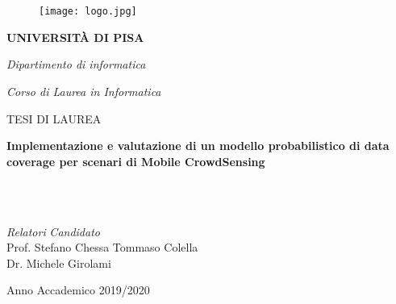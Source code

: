 \begin{titlepage}
\onehalfspacing


 \ \\ \ \\
\begin{figure}[htbp]
\begin{center}
\texttt{[image: logo.jpg]}
\end{center}
\end{figure}


\begin{center}
\begin{large}
\textbf{UNIVERSITÀ DI PISA}
\end{large}

\textsl{Dipartimento di informatica}

\begin{normalsize}
\textsl{Corso di Laurea in Informatica}
\\
\end{normalsize}
\vspace{2cm}
	TESI DI LAUREA \\

\begin{Large}
	\textbf{Implementazione e valutazione di un modello probabilistico di data coverage per scenari di Mobile CrowdSensing} \\
\end{Large}


\ \\ \ \\
\end{center}

\begin{normalsize}
\begin{flushleft}
\textit{Relatori}  \hspace{238pt} \textit{Candidato}
\\ \vspace{5pt} Prof. Stefano Chessa \hspace{6cm} Tommaso Colella
 \\ \vspace{5pt} Dr. Michele Girolami
\end{flushleft}

\end{normalsize}

\vspace{2cm}
\begin{center}
\small{Anno Accademico 2019/2020}
\end{center}

\end{titlepage}

\clearpage\null\thispagestyle{empty}\clearpage     %